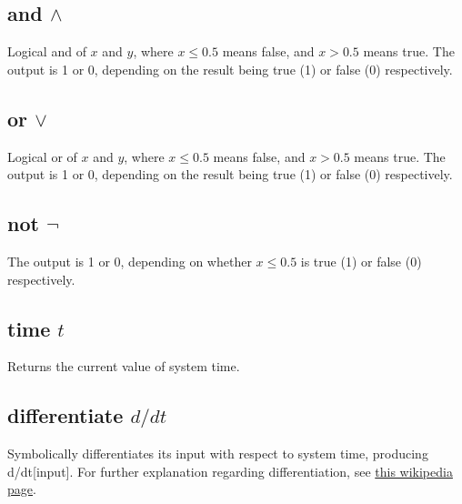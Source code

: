\subsection{and $\wedge$}\label{Operation:and_} Logical and of $x$ and $y$, where
  $x\le 0.5$
  means false, and $x>0.5$ means true. The output is 1 or 0, depending
  on the result being true (1) or false (0) respectively.

\subsection{or $\vee$}\label{Operation:or_} Logical or of $x$ and $y$, where $x\le0.5$
  means false, and $x>0.5$ means true. The output is 1 or 0, depending
  on the result being true (1) or false (0) respectively.

\subsection{not $\neg$}\label{Operation:not_} The output is 1 or 0, depending
  on whether $x\le0.5$ is true (1) or false (0) respectively.

\subsection{time $t$}\label{Operation:time}  Returns the current value of system time.

\subsection{differentiate $d/dt$}\label{Operation:differentiate}
Symbolically differentiates its input with respect to system time, producing d/dt[input]. 
For further explanation regarding differentiation, see \href{https://en.wikipedia.org/wiki/Derivative}{this wikipedia page}.

